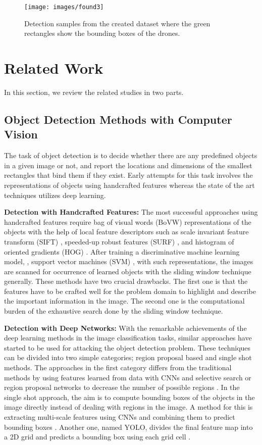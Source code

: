 \documentclass[10pt,twocolumn,letterpaper]{article}
\begin{document}
\begin{figure}[t]
	\texttt{[image: images/found3]}
    \caption{Detection samples from the created dataset where the green rectangles show the bounding boxes of the drones.}
\end{figure}
\section{Related Work}
In this section, we review the related studies in two parts. 

\subsection{Object Detection Methods with Computer Vision}
The task of object detection is to decide whether there are any predefined objects in a given image or not, and report the locations and dimensions of the smallest rectangles that bind them if they exist. Early attempts for this task involves the representations of objects using handcrafted features whereas the state of the art techniques utilizes deep learning.

\textbf{Detection with Handcrafted Features:}
The most successful approaches using handcrafted features require bag of visual words (BoVW) \cite{sivic2003video} representations of the objects with the help of local feature descriptors such as scale invariant feature transform (SIFT) \cite{lowe1999object}, speeded-up robust features (SURF) \cite{bay2008speeded}, and histogram of oriented gradients (HOG) \cite{dalal2005histograms}. After training a discriminative machine learning model, \eg, support vector machines (SVM) \cite{cortes1995support}, with such representations, the images are scanned for occurrence of learned objects with the sliding window technique generally. These methods have two crucial drawbacks. The first one is that the features have to be crafted well for the problem domain to highlight and describe the important information in the image. The second one is the computational burden of the exhaustive search done by the sliding window technique.

\textbf{Detection with Deep Networks:}
With the remarkable achievements of the deep learning methods in the image classification tasks, similar approaches have started to be used for attacking the object detection problem. These techniques can be divided into two simple categories; region proposal based and single shot methods. The approaches in the first category differs from the traditional methods by using features learned from data with CNNs and selective search or region proposal networks to decrease the number of possible regions \cite{girshick2015fast, girshick2014rich, ren2015faster}. In the single shot approach, the aim is to compute bounding boxes of the objects in the image directly instead of dealing with regions in the image. A method for this is extracting multi-scale features using CNNs and combining them to predict bounding boxes \cite{he2014spatial, liu2016ssd}. Another one, named YOLO, divides the final feature map into a 2D grid and predicts a bounding box using each grid cell \cite{redmon2016you}.
\end{document}
